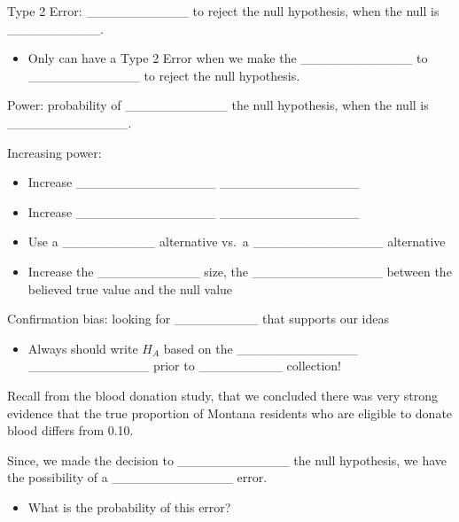 \documentclass[
]{report}
\providecommand{\tightlist}{%
  \setlength{\itemsep}{0pt}\setlength{\parskip}{0pt}}
\begin{document}
Type 2 Error: \_\_\_\_\_\_\_\_\_\_\_ to reject the null hypothesis, when the null is \_\_\_\_\_\_\_\_\_\_.

\begin{itemize}
\tightlist
\item
  Only can have a Type 2 Error when we make the \_\_\_\_\_\_\_\_\_\_\_\_ to \_\_\_\_\_\_\_\_\_\_\_\_ to reject the null hypothesis.
\end{itemize}

Power: probability of \_\_\_\_\_\_\_\_\_\_\_ the null hypothesis, when the null is \_\_\_\_\_\_\_\_\_\_\_\_\_.

\vspace{1.5in}

Increasing power:

\begin{itemize}
\item
  Increase \_\_\_\_\_\_\_\_\_\_\_\_\_\_\_ \_\_\_\_\_\_\_\_\_\_\_\_\_\_\_
\item
  Increase \_\_\_\_\_\_\_\_\_\_\_\_\_\_\_ \_\_\_\_\_\_\_\_\_\_\_\_\_\_\_
\item
  Use a \_\_\_\_\_\_\_\_\_\_ alternative vs.~a \_\_\_\_\_\_\_\_\_\_\_\_\_\_ alternative
\item
  Increase the \_\_\_\_\_\_\_\_\_\_\_ size, the \_\_\_\_\_\_\_\_\_\_\_\_\_\_ between the believed true value and the null value
\end{itemize}

Confirmation bias: looking for \_\_\_\_\_\_\_\_\_ that supports our ideas

\begin{itemize}
\tightlist
\item
  Always should write \(H_A\) based on the \_\_\_\_\_\_\_\_\_\_\_\_\_ \_\_\_\_\_\_\_\_\_\_\_\_\_ prior to \_\_\_\_\_\_\_\_\_ collection!
\end{itemize}


Recall from the blood donation study, that we concluded there was very strong evidence that the true proportion of Montana residents who are eligible to donate blood differs from 0.10.


Since, we made the decision to \_\_\_\_\_\_\_\_\_\_\_\_ the null hypothesis, we have the possibility of a \_\_\_\_\_\_\_\_\_\_\_\_\_ error.


\begin{itemize}
\tightlist
\item
  What is the probability of this error?
\end{itemize}
\end{document}
